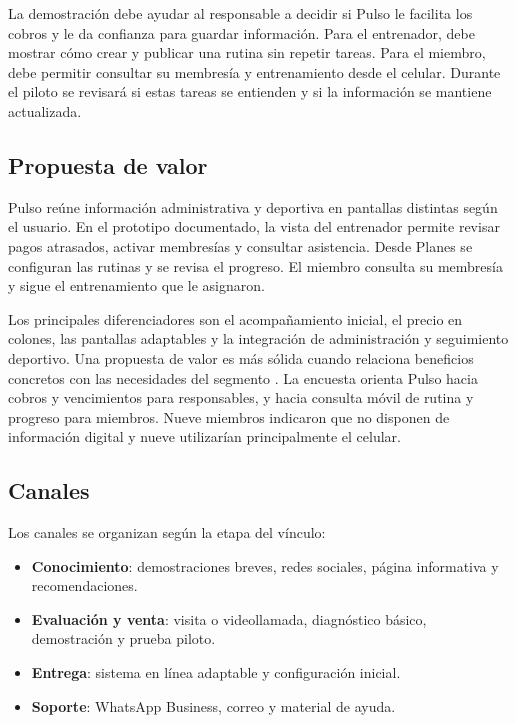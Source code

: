 La demostración debe ayudar al responsable a decidir si Pulso le facilita los
cobros y le da confianza para guardar información. Para el entrenador, debe
mostrar cómo crear y publicar una rutina sin repetir tareas. Para el miembro,
debe permitir consultar su membresía y entrenamiento desde el celular. Durante
el piloto se revisará si estas tareas se entienden y si la información se
mantiene actualizada.

\subsection{Propuesta de valor}

Pulso reúne información administrativa y deportiva en pantallas distintas según
el usuario. En el prototipo documentado, la vista del entrenador permite revisar
pagos atrasados, activar membresías y consultar asistencia. Desde Planes se
configuran las rutinas y se revisa el progreso. El miembro consulta su membresía
y sigue el entrenamiento que le asignaron.

Los principales diferenciadores son el acompañamiento inicial, el precio en
colones, las pantallas adaptables y la integración de
administración y seguimiento deportivo. Una propuesta de valor es más sólida
cuando relaciona beneficios concretos con las necesidades del segmento
\parencite{kotler2018}. La encuesta orienta Pulso hacia cobros y vencimientos
para responsables, y hacia consulta móvil de rutina y progreso para miembros.
Nueve miembros indicaron que no disponen de información digital y nueve
utilizarían principalmente el celular.

\subsection{Canales}

Los canales se organizan según la etapa del vínculo:

\begin{itemize}
  \item \textbf{Conocimiento}: demostraciones breves, redes sociales, página
  informativa y recomendaciones.
  \item \textbf{Evaluación y venta}: visita o videollamada, diagnóstico básico,
  demostración y prueba piloto.
  \item \textbf{Entrega}: sistema en línea adaptable y configuración inicial.
  \item \textbf{Soporte}: WhatsApp Business, correo y material de ayuda.
\end{itemize}

